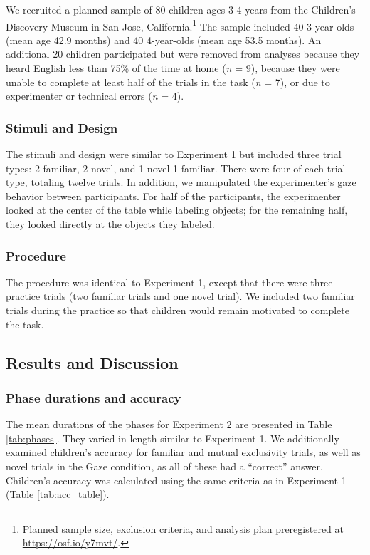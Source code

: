 \documentclass[a4paper,man,apacite,floatsintext]{apa6}
\begin{document}
We recruited a planned sample of 80 children ages 3-4 years from the
Children's Discovery Museum in San Jose, California.\footnote{Planned
  sample size, exclusion criteria, and analysis plan preregistered at
  \url{https://osf.io/y7mvt/}.} The sample included 40 3-year-olds (mean
age 42.9 months) and 40 4-year-olds (mean age 53.5 months). An
additional 20 children participated but were removed from analyses
because they heard English less than 75\% of the time at home (\emph{n}
= 9), because they were unable to complete at least half of the trials
in the task (\emph{n} = 7), or due to experimenter or technical errors
(\emph{n} = 4).

\subsubsection{Stimuli and Design}\label{stimuli-and-design-1}

The stimuli and design were similar to Experiment 1 but included three
trial types: 2-familiar, 2-novel, and 1-novel-1-familiar. There were
four of each trial type, totaling twelve trials. In addition, we
manipulated the experimenter's gaze behavior between participants. For
half of the participants, the experimenter looked at the center of the
table while labeling objects; for the remaining half, they looked
directly at the objects they labeled.

\subsubsection{Procedure}\label{procedure-1}

The procedure was identical to Experiment 1, except that there were
three practice trials (two familiar trials and one novel trial). We
included two familiar trials during the practice so that children would
remain motivated to complete the task.

\subsection{Results and Discussion}\label{results-and-discussion-1}

\subsubsection{Phase durations and
accuracy}\label{phase-durations-and-accuracy-1}

The mean durations of the phases for Experiment 2 are presented in Table
\ref{tab:phases}. They varied in length similar to Experiment 1. We
additionally examined children's accuracy for familiar and mutual
exclusivity trials, as well as novel trials in the Gaze condition, as
all of these had a ``correct'' answer. Children's accuracy was
calculated using the same criteria as in Experiment 1 (Table
\ref {tab:acc_table}).
\end{document}
